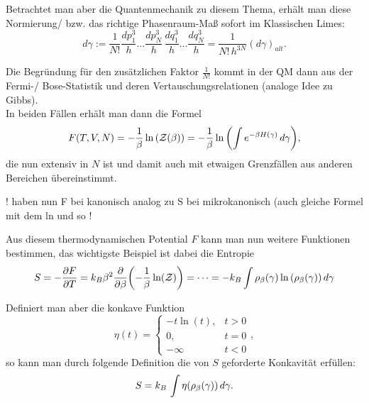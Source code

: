 \documentclass[../KlassMech_main.tex]{subfiles}
\begin{document}
Betrachtet man aber die Quantenmechanik zu diesem Thema, erhält man diese Normierung/ bzw. das richtige Phasenraum-Maß sofort im Klassischen Limes:
\begin{equation}\label{key}
d\gamma:= \frac{1}{N!} \frac{dp^3_1}{h} \dots \frac{dp^3_N}{h} \, \frac{dq^3_1}{h} \dots \frac{dq^3_N}{h} = \frac{1}{N! \, h^{3N}} (d\gamma)_{alt} .
\end{equation}

Die Begründung für den zusätzlichen Faktor $\frac{1}{N!}$ kommt in der QM dann aus der Fermi-/ Bose-Statistik und deren Vertauschungsrelationen (analoge Idee zu Gibbs).\\


In beiden Fällen erhält man dann die Formel
\begin{equation}\label{key}
F(T, V, N) = -\frac{1}{\beta} \ln\qty(\mathcal{Z}(\beta)) = -\frac{1}{\beta} \ln\qty(\int e^{-\beta H(\gamma)} \, d\gamma) ,
\end{equation}
die nun extensiv in $N$ ist und damit auch mit etwaigen Grenzfällen aus anderen Bereichen übereinstimmt.

! haben nun F bei kanonisch analog zu S bei mikrokanonisch (auch gleiche Formel mit dem ln und so !

Aus diesem thermodynamischen Potential $F$ kann man nun weitere Funktionen bestimmen, das wichtigste Beispiel ist dabei die Entropie
\begin{equation}\label{key}
S = -\pdv{F}{T} = k_B \beta^2 \pdv{\beta}\qty(-\frac{1}{\beta} \ln(\mathcal{Z})) = \dots = - k_B \int \rho_\beta(\gamma) \ln\qty(\rho_\beta(\gamma)) \, d\gamma
\end{equation}

Definiert man aber die konkave Funktion
\begin{equation}\label{key}
\eta(t) = \begin{cases} -t \ln(t), & t > 0 \\ 0, & t = 0 \\ -\infty & t < 0 \end{cases},
\end{equation}
so kann man durch folgende Definition die von $S$ geforderte Konkavität erfüllen:
\begin{equation}\label{key}
S = k_B \, \int \eta\qty(\rho_\beta(\gamma)) \, d\gamma .
\end{equation}
\end{document}
